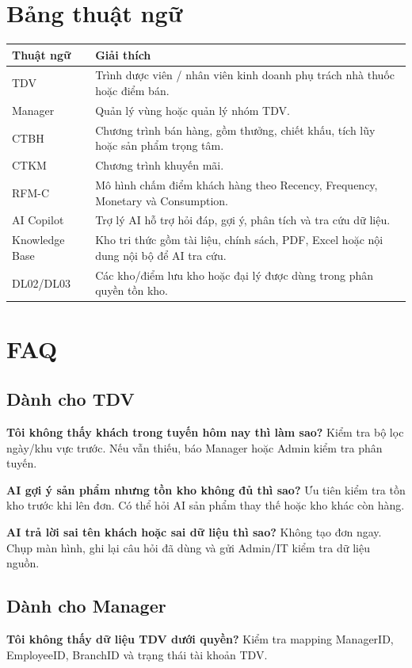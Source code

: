\documentclass[12pt,a4paper,oneside,openany]{book}
\begin{document}
\chapter{Bảng thuật ngữ}
\begin{longtable}{p{4cm}p{10cm}}
\toprule
\textbf{Thuật ngữ} & \textbf{Giải thích} \\
\midrule
TDV & Trình dược viên / nhân viên kinh doanh phụ trách nhà thuốc hoặc điểm bán. \\
Manager & Quản lý vùng hoặc quản lý nhóm TDV. \\
CTBH & Chương trình bán hàng, gồm thưởng, chiết khấu, tích lũy hoặc sản phẩm trọng tâm. \\
CTKM & Chương trình khuyến mãi. \\
RFM-C & Mô hình chấm điểm khách hàng theo Recency, Frequency, Monetary và Consumption. \\
AI Copilot & Trợ lý AI hỗ trợ hỏi đáp, gợi ý, phân tích và tra cứu dữ liệu. \\
Knowledge Base & Kho tri thức gồm tài liệu, chính sách, PDF, Excel hoặc nội dung nội bộ để AI tra cứu. \\
DL02/DL03 & Các kho/điểm lưu kho hoặc đại lý được dùng trong phân quyền tồn kho. \\
\bottomrule
\end{longtable}

\chapter{FAQ}

\section*{Dành cho TDV}
\textbf{Tôi không thấy khách trong tuyến hôm nay thì làm sao?} Kiểm tra bộ lọc ngày/khu vực trước. Nếu vẫn thiếu, báo Manager hoặc Admin kiểm tra phân tuyến.

\textbf{AI gợi ý sản phẩm nhưng tồn kho không đủ thì sao?} Ưu tiên kiểm tra tồn kho trước khi lên đơn. Có thể hỏi AI sản phẩm thay thế hoặc kho khác còn hàng.

\textbf{AI trả lời sai tên khách hoặc sai dữ liệu thì sao?} Không tạo đơn ngay. Chụp màn hình, ghi lại câu hỏi đã dùng và gửi Admin/IT kiểm tra dữ liệu nguồn.

\section*{Dành cho Manager}
\textbf{Tôi không thấy dữ liệu TDV dưới quyền?} Kiểm tra mapping ManagerID, EmployeeID, BranchID và trạng thái tài khoản TDV.
\end{document}
